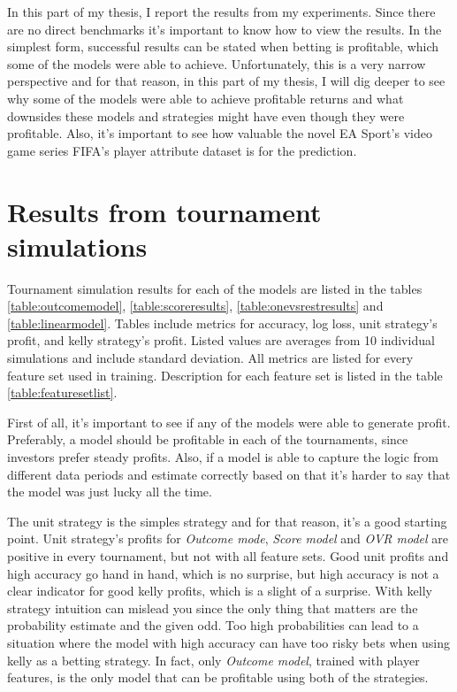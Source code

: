 In this part of my thesis, I report the results from my experiments. Since there are no direct benchmarks it's important to know how to view the results. In the simplest form, successful results can be stated when betting is profitable, which some of the models were able to achieve. Unfortunately, this is a very narrow perspective and for that reason, in this part of my thesis, I will dig deeper to see why some of the models were able to achieve profitable returns and what downsides these models and strategies might have even though they were profitable. Also, it's important to see how valuable the novel EA Sport's video game series FIFA's player attribute dataset is for the prediction.

\section{Results from tournament simulations}
Tournament simulation results for each of the models are listed in the tables \ref{table:outcomemodel}, \ref{table:scoreresults}, \ref{table:onevsrestresults} and \ref{table:linearmodel}. Tables include metrics for accuracy, log loss, unit strategy's profit, and kelly strategy's profit. Listed values are averages from 10 individual simulations and include standard deviation. All metrics are listed for every feature set used in training. Description for each feature set is listed in the table \ref{table:featuresetlist}.

First of all, it's important to see if any of the models were able to generate profit. Preferably, a model should be profitable in each of the tournaments, since investors prefer steady profits. Also, if a model is able to capture the logic from different data periods and estimate correctly based on that it's harder to say that the model was just lucky all the time.

The unit strategy is the simples strategy and for that reason, it's a good starting point. Unit strategy's profits for \textit{Outcome mode}, \textit{Score model} and \textit{OVR model} are positive in every tournament, but not with all feature sets.  Good unit profits and high accuracy go hand in hand, which is no surprise, but high accuracy is not a clear indicator for good kelly profits, which is a slight of a surprise. With kelly strategy intuition can mislead you since the only thing that matters are the probability estimate and the given odd. Too high probabilities can lead to a situation where the model with high accuracy can have too risky bets when using kelly as a betting strategy.  In fact, only \textit{Outcome model}, trained with player features, is the only model that can be profitable using both of the strategies.

